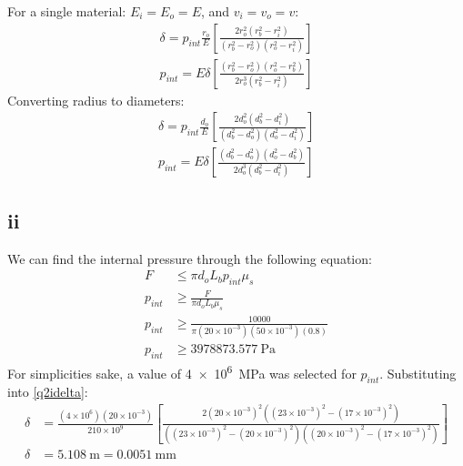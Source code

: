\documentclass[11pt]{article}
\numberwithin{equation}{section}
\begin{document}
For a single material: $E_i = E_o = E$, and $v_i = v_o = v$:
\begin{gather}
    \delta = p_{int} \frac{r_o}{E}\left[\frac{2r_o^2\left(r_b^2-r_i^2\right)}{\left(r_b^2 - r_o^2\right)\left(r_o^2-r_i^2\right)}\right] \label{q2idelta}\\
    p_{int} = E \delta \left[\frac{\left(r_b^2 - r_o^2\right)\left(r_o^2 - r_b^2\right)}{2r_o^3\left(r_b^2 - r_i^2\right)}\right]
\end{gather}
Converting radius to diameters:
\begin{gather}
    \delta = p_{int} \frac{d_o}{E}\left[\frac{2d_o^2\left(d_b^2-d_i^2\right)}{\left(d_b^2 - d_o^2\right)\left(d_o^2-d_i^2\right)}\right]\\
    p_{int} = E \delta \left[\frac{\left(d_b^2 - d_o^2\right)\left(d_o^2 - d_b^2\right)}{2d_o^3\left(d_b^2 - d_i^2\right)}\right]
\end{gather}
\subsection{ii}
We can find the internal pressure through the following equation:
\begin{align}
    F &\leq \pi d_o L_b p_{int} \mu_s\\
    p_{int} &\geq \frac{F}{\pi d_o L_b \mu_s}\\
    p_{int} &\geq \frac{10000}{\pi (20\times 10^{-3})(50\times 10^{-3})(0.8)}\\
    p_{int} &\geq \SI{3978873.577}{\pascal}
\end{align}
For simplicities sake, a value of \SI{4e6}{\mega\pascal} was selected for $p_{int}$. Substituting into \ref{q2idelta}:
\begin{align}
    \delta &= \frac{(4\times 10^{6})(20\times 10^{-3})}{210\times 10^9}\left[\frac{2(20\times 10^{-3})^2\left((23\times 10^{-3})^2-(17\times 10^{-3})^2\right)}{\left((23\times 10^{-3})^2 - (20\times 10^{-3})^2\right)\left((20\times 10^{-3})^2-(17\times 10^{-3})^2\right)}\right]\\
    \delta &= \SI{5.108}{\meter} = \SI{0.0051}{\milli\meter}
\end{align}
\end{document}
